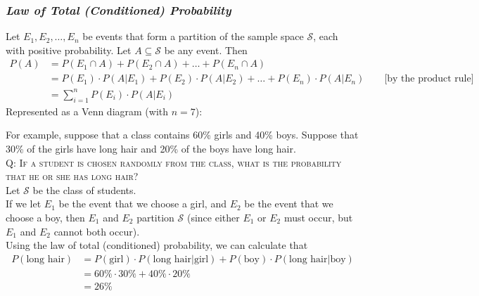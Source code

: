 \documentclass{article}
\begin{document}
\subsubsection*{\em Law of Total (Conditioned) Probability}
Let $E_1,E_2,\ldots,E_n$ be events that form a partition of the sample space $\mathcal{S}$, each with positive probability. Let $A\subseteq\mathcal{S}$ be any event. Then
\begin{align*}
P(A)&=P(E_1\cap A)+P(E_2\cap A)+\ldots+P(E_n\cap A)\\
&=P(E_1)\cdot P(A|E_1)+P(E_2)\cdot P(A|E_2)+\ldots+P(E_n)\cdot P(A|E_n)\qquad\text{[by the product rule]}\\
&=\sum\limits_{i=1}^nP(E_i)\cdot P(A|E_i)
\end{align*}
Represented as a Venn diagram (with $n=7$):
\begin{center}
\end{center}
For example, suppose that a class contains 60\% girls and 40\% boys. Suppose that 30\% of the girls have long hair and 20\% of the boys have long hair.\\[1ex]
\textsc{Q: If a student is chosen randomly from the class, what is the probability that he or she has long hair?}\\[1em]
Let $\mathcal{S}$ be the class of students.\\
If we let $E_1$ be the event that we choose a girl, and $E_2$ be the event that we choose a boy, then $E_1$ and $E_2$ partition $\mathcal{S}$ (since either $E_1$ or $E_2$ must occur, but $E_1$ and $E_2$ cannot both occur).\\[1ex]
Using the law of total (conditioned) probability, we can calculate that
\begin{align*}
P(\text{long hair})&=P(\text{girl})\cdot P(\text{long hair}|\text{girl})+P(\text{boy})\cdot P(\text{long hair}|\text{boy})\\
&=60\%\cdot 30\%+40\%\cdot 20\%\\
&=26\%
\end{align*}
\end{document}
